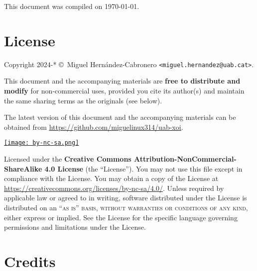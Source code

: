 
\newpage

\thispagestyle{empty}

This document was compiled on \today.

\section*{License}

\noindent Copyright 2024-* \copyright\ Miguel Hernández-Cabronero \texttt{<miguel.hernandez@uab.cat>}.

\noindent This document and the accompanying materials are \textbf{free to distribute and modify} for non-commercial uses, 
provided you cite its author(s) and maintain the same sharing terms as the originals (see below).

\noindent The latest version of this document and the accompanying materials can be obtained 
from \href{https://github.com/miguelinux314/uab-xoi}{\underline{https://github.com/miguelinux314/uab-xoi}}.

\begin{center}
\noindent\href{https://creativecommons.org/licenses/by-nc-sa/4.0/}{\texttt{[image: by-nc-sa.png]}}
\end{center}

\noindent Licensed under the \textbf{Creative Commons Attribution-NonCommercial-ShareAlike 4.0 License} (the ``License''). You may not use this file except in compliance with the License. You may obtain a copy of the License at \url{https://creativecommons.org/licenses/by-nc-sa/4.0/}. Unless required by applicable law or agreed to in writing, software distributed under the License is distributed on an \textsc{``as is'' basis, without warranties or conditions of any kind}, either express or implied. See the License for the specific language governing permissions and limitations under the License.\\ %

\vfill

\section*{Credits}

